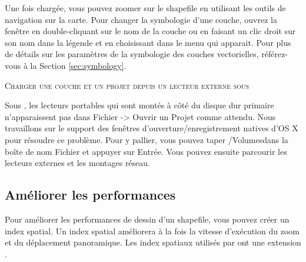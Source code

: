 Une fois chargée, vous pouvez zoomer sur le shapefile en utilisant les outils de navigation sur la carte.
Pour changer la symbologie d'une couche, ouvrez la fenêtre  en double-cliquant sur le nom de la couche ou en faisant un clic droit sur son nom dans la légende et en choisissant  dans le menu qui apparait. Pour plus de détails sur les paramètres de la symbologie des couches vectorielles, référez-vous à la Section \ref{sec:symbology}.

\begin{Tip}\caption{\textsc{Charger une couche et un projet depuis un lecteur externe sous \mac}}
Sous \mac, les lecteurs portables qui sont montés à côté du disque dur primaire n'apparaissent pas dans Fichier -> Ouvrir un Projet comme attendu. Nous travaillons sur le support des fenêtres d'ouverture/enregistrement natives d'OS X pour résoudre ce problème. Pour y pallier, vous pouvez taper \og /Volumes\fg dans la boîte de nom Fichier et appuyer sur Entrée. Vous pouvez ensuite parcourir les lecteurs externes et les montages réseau.
\end{Tip}

\subsection{Améliorer les performances}

Pour améliorer les performances de dessin d'un shapefile, vous pouvez créer un index spatial. Un  index spatial améliorera à la fois la vitesse d'exécution du zoom et du déplacement panoramique. Les index spatiaux utilisés par \qg ont une extension .

